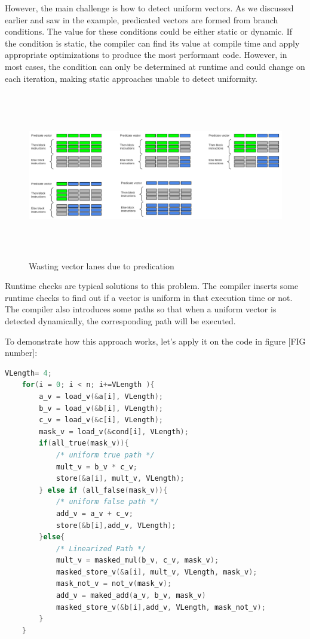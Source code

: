 \documentclass[\main/thesis.tex]{subfiles}
\begin{document}
However, the main challenge is how to detect uniform vectors. As we discussed earlier and saw in the example, predicated vectors are formed from branch conditions. The value for these conditions could be either static or dynamic. If the condition is static, the compiler can find its value at compile time and apply appropriate optimizations to produce the most performant code. However, in most cases, the condition can only be determined at runtime and could change on each iteration, making static approaches unable to detect uniformity.

\begin{figure}[t!]
    \centering
    \includegraphics[width=1.1\textwidth, height=7.3cm]{img/condition_distribution.png}
    \caption{Wasting vector lanes due to predication}
    \label{fig:Permutation}
\end{figure}

Runtime checks are typical solutions to this problem. The compiler inserts some runtime checks to find out if a vector is uniform in that execution time or not. The compiler also introduces some paths so that when a uniform vector is detected dynamically, the corresponding path will be executed.

To demonstrate how this approach works, let's apply it on the code in figure [FIG number]:

\begin{lstlisting}[language=C]
    VLength= 4;
    for(i = 0; i < n; i+=VLength ){
        a_v = load_v(&a[i], VLength);
        b_v = load_v(&b[i], VLength);
        c_v = load_v(&c[i], VLength);
        mask_v = load_v(&cond[i], VLength);
        if(all_true(mask_v)){
            /* uniform true path */
            mult_v = b_v * c_v;
            store(&a[i], mult_v, VLength);
        } else if (all_false(mask_v)){
            /* uniform false path */
            add_v = a_v + c_v;
            store(&b[i],add_v, VLength);
        }else{
            /* Linearized Path */
            mult_v = masked_mul(b_v, c_v, mask_v);
            masked_store_v(&a[i], mult_v, VLength, mask_v);
            mask_not_v = not_v(mask_v);
            add_v = maked_add(a_v, b_v, mask_v)
            masked_store_v(&b[i],add_v, VLength, mask_not_v);
        }
    }
\end{lstlisting}
\end{document}

